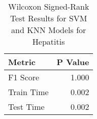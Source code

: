 \begin{table}
\centering
\caption{Wilcoxon Signed-Rank Test Results for SVM and KNN Models for Hepatitis}
\label{tab:svm_knn_wilcoxon_comparison_hepatitis}
\begin{tabular}{lr}
\toprule
Metric & P Value \\
\midrule
F1 Score & 1.000 \\
Train Time & 0.002 \\
Test Time & 0.002 \\
\bottomrule
\end{tabular}
\end{table}
